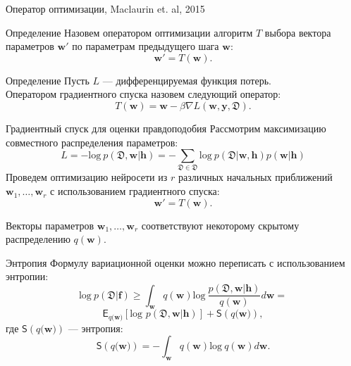 \documentclass[usenames,dvipsnames,10pt,pdf,utf8,russian,aspectratio=43]{beamer}
\begin{document}
\begin{frame}{Оператор оптимизации, Maclaurin et. al, 2015}
\begin{block}{Определение}
Назовем оператором оптимизации алгоритм $T$ выбора вектора параметров $\mathbf{w}'$  по параметрам предыдущего шага $\mathbf{w}$:
\[
	\mathbf{w}' = T(\mathbf{w}).
\]
\end{block}

\begin{block}{Определение}
Пусть $L$ --- дифференцируемая функция потерь. \\
Оператором градиентного спуска назовем следующий оператор:
\[
    T(\mathbf{w}) = \mathbf{w} - \beta \nabla L(\mathbf{w}, \mathbf{y}, \mathfrak{D}).
\]
\end{block}


\end{frame}

\begin{frame}{Градиентный спуск для оценки правдоподобия}
Рассмотрим максимизацию совместного распределения параметров:
\[
    L =  -\text{log}~p(\mathfrak{D},\mathbf{w}|\mathbf{h}) = -\sum_{\mathfrak{D} \in \mathfrak{D}} \text{log}~p(\mathfrak{D}|\mathbf{w}, \mathbf{h}) p(\mathbf{w}|\mathbf{h})
\]
Проведем оптимизацию нейросети  из $r$ различных начальных приближений $\mathbf{w}_1, \dots, \mathbf{w}_r$ с использованием градиентного спуска:
\[
\mathbf{w}' = T(\mathbf{w}).
\]

Векторы параметров $\mathbf{w}_1,\dots,\mathbf{w}_r$ соответствуют некоторому скрытому распределению $q(\mathbf{w})$.

\end{frame}



\begin{frame}{Энтропия}
Формулу вариационной оценки можно переписать с использованием энтропии:
$$\text{log}~p(\mathfrak{D}|\mathbf{f}) \geq 
\int_{\mathbf{w}} q(\mathbf{w})\text{log}~\frac{p(\mathfrak{D},\mathbf{w}|\mathbf{h})}{q(\mathbf{w})}d\mathbf{w} = 
$$
$$
\mathsf{E}_{q(\mathbf{w)}}[\text{log~}p (\mathfrak{D}, \mathbf{w}| \mathbf{h})] + \mathsf{S}({q(\mathbf{w)}}),
$$
где $\mathsf{S}({q(\mathbf{w)}})$ --- энтропия:
$$
\mathsf{S}({q(\mathbf{w)}}) = - \int_{\mathbf{w}} q(\mathbf{w})\text{log}~q(\mathbf{w})d\mathbf{w}.  	
$$
\end{frame}
\end{document}

